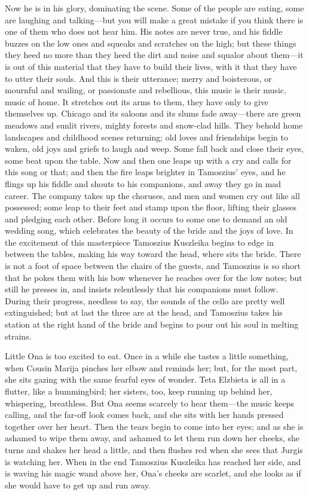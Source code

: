 \documentclass[
]{book}
\theoremstyle{definition}
\theoremstyle{definition}
\theoremstyle{definition}
\theoremstyle{definition}
\theoremstyle{remark}
\begin{document}
Now he is in his glory, dominating the scene. Some of the people are eating, some are laughing and talking---but you will make a great mistake if you think there is one of them who does not hear him. His notes are never true, and his fiddle buzzes on the low ones and squeaks and scratches on the high; but these things they heed no more than they heed the dirt and noise and squalor about them---it is out of this material that they have to build their lives, with it that they have to utter their souls. And this is their utterance; merry and boisterous, or mournful and wailing, or passionate and rebellious, this music is their music, music of home. It stretches out its arms to them, they have only to give themselves up. Chicago and its saloons and its slums fade away---there are green meadows and sunlit rivers, mighty forests and snow-clad hills. They behold home landscapes and childhood scenes returning; old loves and friendships begin to waken, old joys and griefs to laugh and weep. Some fall back and close their eyes, some beat upon the table. Now and then one leaps up with a cry and calls for this song or that; and then the fire leaps brighter in Tamoszius' eyes, and he flings up his fiddle and shouts to his companions, and away they go in mad career. The company takes up the choruses, and men and women cry out like all possessed; some leap to their feet and stamp upon the floor, lifting their glasses and pledging each other. Before long it occurs to some one to demand an old wedding song, which celebrates the beauty of the bride and the joys of love. In the excitement of this masterpiece Tamoszius Kuszleika begins to edge in between the tables, making his way toward the head, where sits the bride. There is not a foot of space between the chairs of the guests, and Tamoszius is so short that he pokes them with his bow whenever he reaches over for the low notes; but still he presses in, and insists relentlessly that his companions must follow. During their progress, needless to say, the sounds of the cello are pretty well extinguished; but at last the three are at the head, and Tamoszius takes his station at the right hand of the bride and begins to pour out his soul in melting strains.

Little Ona is too excited to eat. Once in a while she tastes a little something, when Cousin Marija pinches her elbow and reminds her; but, for the most part, she sits gazing with the same fearful eyes of wonder. Teta Elzbieta is all in a flutter, like a hummingbird; her sisters, too, keep running up behind her, whispering, breathless. But Ona seems scarcely to hear them---the music keeps calling, and the far-off look comes back, and she sits with her hands pressed together over her heart. Then the tears begin to come into her eyes; and as she is ashamed to wipe them away, and ashamed to let them run down her cheeks, she turns and shakes her head a little, and then flushes red when she sees that Jurgis is watching her. When in the end Tamoszius Kuszleika has reached her side, and is waving his magic wand above her, Ona's cheeks are scarlet, and she looks as if she would have to get up and run away.
\end{document}
